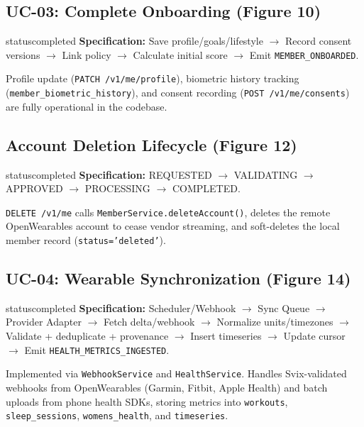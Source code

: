 \documentclass[11pt,a4paper]{article}
\begin{document}
\subsection{UC-03: Complete Onboarding (Figure 10)}
\begin{statusbox}{statuscompleted}
    \textbf{Specification:} Save profile/goals/lifestyle $\to$ Record consent versions $\to$ Link policy $\to$ Calculate initial score $\to$ Emit \texttt{MEMBER\_ONBOARDED}.
\end{statusbox}
Profile update (\texttt{PATCH /v1/me/profile}), biometric history tracking (\texttt{member\_biometric\_history}), and consent recording (\texttt{POST /v1/me/consents}) are fully operational in the codebase.

\subsection{Account Deletion Lifecycle (Figure 12)}
\begin{statusbox}{statuscompleted}
    \textbf{Specification:} REQUESTED $\to$ VALIDATING $\to$ APPROVED $\to$ PROCESSING $\to$ COMPLETED.
\end{statusbox}
\texttt{DELETE /v1/me} calls \texttt{MemberService.deleteAccount()}, deletes the remote OpenWearables account to cease vendor streaming, and soft-deletes the local member record (\texttt{status='deleted'}).

\subsection{UC-04: Wearable Synchronization (Figure 14)}
\begin{statusbox}{statuscompleted}
    \textbf{Specification:} Scheduler/Webhook $\to$ Sync Queue $\to$ Provider Adapter $\to$ Fetch delta/webhook $\to$ Normalize units/timezones $\to$ Validate + deduplicate + provenance $\to$ Insert timeseries $\to$ Update cursor $\to$ Emit \texttt{HEALTH\_METRICS\_INGESTED}.
\end{statusbox}
Implemented via \texttt{WebhookService} and \texttt{HealthService}. Handles Svix-validated webhooks from OpenWearables (Garmin, Fitbit, Apple Health) and batch uploads from phone health SDKs, storing metrics into \texttt{workouts}, \texttt{sleep\_sessions}, \texttt{womens\_health}, and \texttt{timeseries}.
\end{document}

